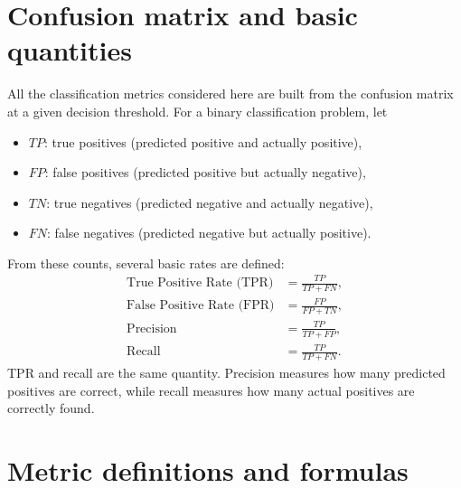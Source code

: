 \documentclass{article}
\begin{document}
\section{Confusion matrix and basic quantities}
All the classification metrics considered here are built from the confusion matrix at a given decision threshold. For a binary classification problem, let
\begin{itemize}
\item $TP$: true positives (predicted positive and actually positive),
\item $FP$: false positives (predicted positive but actually negative),
\item $TN$: true negatives (predicted negative and actually negative),
\item $FN$: false negatives (predicted negative but actually positive).
\end{itemize}
From these counts, several basic rates are defined:
\begin{align}
\text{True Positive Rate (TPR)} &= \frac{TP}{TP+FN}, \\
\text{False Positive Rate (FPR)} &= \frac{FP}{FP+TN}, \\
\text{Precision} &= \frac{TP}{TP+FP}, \\
\text{Recall} &= \frac{TP}{TP+FN}.
\end{align}
TPR and recall are the same quantity. Precision measures how many predicted positives are correct, while recall measures how many actual positives are correctly found.

\section{Metric definitions and formulas}
\end{document}
